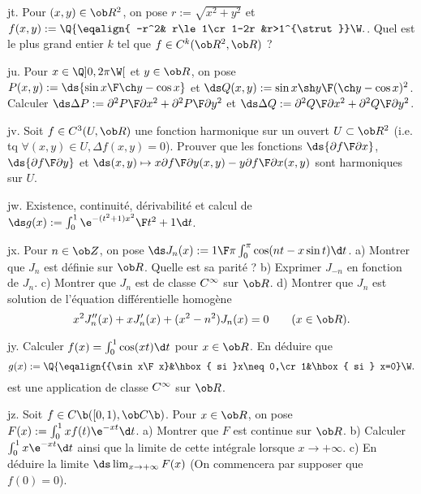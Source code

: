 \exo [Level=2,Fight=1,Learn=1,Field=\FonctionsDePlusieursVariables,Type=\Exercices,Origin=] jt. 
Pour $(x,y)\in\ob R^2$, on pose $r:=\sqrt{x^2+y^2}$ 
et $f(x,y):=\Q\{\eqalign{
-r^2& r\le1\cr 1-2r &r>1^{\strut}}\W.$. \pn
Quel est le plus grand entier $k$ tel que $f\in\sc C^k(\ob R^2,\ob R)$ ?   

\exo [Level=2,Fight=0,Learn=0,Field=\FonctionsDePlusieursVariables,Type=\Exercices,Origin=] ju. 
Pour $x\in\Q]0,2\pi\W[$ et $y\in\ob R$, on pose $P(x,y):=\ds{\sin x\F\ch y-\cos x}$ 
et $\ds Q(x,y):={\sin x\sh y\F(\ch y-\cos x)^2}$. \pn
Calculer $\ds\Delta P:={\partial^2P\F\partial x^2}+{\partial^2P\F\partial y^2}$ 
et $\ds\Delta Q:={\partial^2Q\F\partial x^2}+{\partial^2Q\F\partial y^2}$. 

\exo [Level=2,Fight=1,Learn=1,Field=\FonctionsDePlusieursVariables,Type=\Exercices,Origin=] jv. 
Soit $f\in\sc C^3(U,\ob R)$ une fonction harmonique sur un ouvert $U\subset\ob R^2$ 
(i.e. tq $\forall(x,y)\in U,\Delta f(x,y)=0$). \pn
Prouver que les fonctions $\ds {\partial f\F\partial x}$, $\ds{\partial f\F\partial y}$ 
et $\ds(x,y)\mapsto x{\partial f\F\partial y}(x,y)-y{\partial f\F\partial x}(x,y)$ sont harmoniques sur $U$. 

\exo [Level=2,Fight=1,Learn=1,Field=\FonctionsDéfiniesParUneIntégrale,Type=\Exercices,Origin=] jw. 
Existence, continuité, dérivabilité et calcul de 
$\ds g(x):=\int_0^1{\e^{-(t^2+1)x^2}\F t^2+1}\d t$. 

\exo [Level=2,Fight=2,Learn=2,Field=\FonctionsDéfiniesParUneIntégrale,Type=\Exercices,Origin=] jx. 
Pour $n\in\ob Z$, on pose $\ds J_n(x):={1\F\pi}\int_0^\pi\cos(nt-x\sin t)\d t$. \pn
a) Montrer que $J_n$ est définie sur $\ob R$. Quelle est sa parité ? \pn
b) Exprimer $J_{-n}$ en fonction de $J_n$. \pn
c) Montrer que $J_n$ est de classe $\sc C^\infty$ sur $\ob R$. \pn
d) Montrer que $J_n$ est solution de l'équation différentielle homogène 
$$
x^2J_n''(x)+xJ_n'(x)+(x^2-n^2)J_n(x)=0\qquad(x\in\ob R).
$$

\exo [Level=2,Fight=0,Learn=1,Field=\FonctionsDéfiniesParUneIntégrale,Type=\Exercices,Origin=] jy. 
Calculer $f(x)=\int_0^1\cos(xt)\d t$ pour $x\in\ob R$. En déduire que 
$$
g(x):=\Q\{\eqalign{{\sin x\F x}&\hbox{ si }x\neq0,\cr 1&\hbox{ si } x=0}\W.
$$ 
est une application de classe $\sc C^\infty$ sur $\ob R$. 

\exo [Level=2,Fight=2,Learn=2,Field=\FonctionsDéfiniesParUneIntégrale,Type=\Exercices,Origin=] jz. 
Soit $f\in\sc C\b([0,1),\ob C\b)$. Pour $x\in\ob R$, on pose $F(x):=\int_0^1 xf(t)\e^{-xt}\d t$. \pn
a) Montrer que $F$ est continue sur $\ob R$. \pn
b) Calculer $\int_0^1 x\e^{-xt}\d t$ ainsi que la limite de cette intégrale lorsque $x\to+\infty$. \pn
c) En déduire la limite $\ds\lim_{x\to+\infty}F(x)$ (On commencera par supposer que $f(0)=0$). 

